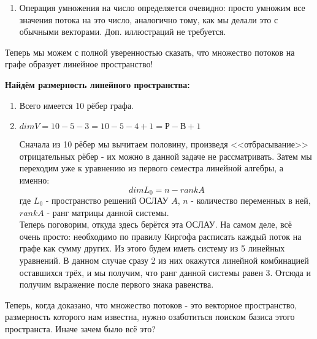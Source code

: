 \begin{enumerate}
    \item Операция умножения на число определяется очевидно: просто умножим все значения потока 
    на это число, аналогично тому, как мы делали это с обычными векторами. Доп. иллюстраций не 
    требуется.
\end{enumerate}

Теперь мы можем с полной уверенностью сказать, что множество потоков на графе образует линейное 
пространство!

\textbf{Найдём размерность линейного пространства:}

\begin{enumerate}
    \item Всего имеется 10 рёбер графа.
    \item $dimV = 10 - 5 - 3 = 10 -5 -4 + 1 =  Р-В+1$
    \begin{explanation*}
        Сначала из 10 рёбер мы вычитаем половину, произведя <<отбрасывание>> отрицательных рёбер - 
        их можно в данной задаче не рассматривать. Затем мы переходим уже к уравнению из первого 
        семестра линейной алгебры, а именно:
        $$
        dim L_{0} = n - rankA 
        $$
        где $L_{0}$ - пространство решений ОСЛАУ $A$, $n$ - количество переменных в ней, $rankA$ - ранг матрицы данной 
        системы.\\ 
        Теперь поговорим, откуда здесь берётся эта ОСЛАУ. На самом деле, всё очень просто: 
        необходимо по правилу Киргофа расписать каждый поток на графе как сумму других. Из этого будем 
        иметь систему из 5 линейных уравнений. В данном случае сразу 2 из них окажутся линейной 
        комбинацией оставшихся трёх, и мы получим, что ранг данной системы равен 3. Отсюда и получим 
        выражение после первого знака равенства.
    \end{explanation*}
\end{enumerate}
\newpage
Теперь, когда доказано, что множество потоков - это векторное пространство, 
размерность которого нам известна, нужно озаботиться поиском базиса этого 
пространста. Иначе зачем было всё это?

